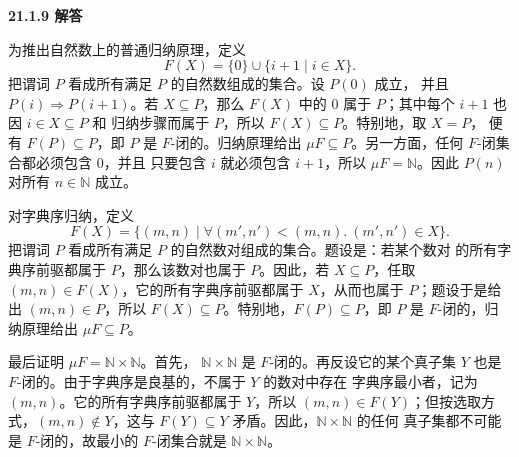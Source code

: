 \begin{taplauthorsolutionentrybox}
\label{sol:author:21.1.9}
\textbf{21.1.9 解答}

为推出自然数上的普通归纳原理，定义
\[
F(X)=\{0\}\cup\{i+1\mid i\in X\}.
\]
把谓词 \(P\) 看成所有满足 \(P\) 的自然数组成的集合。设 \(P(0)\) 成立，
并且 \(P(i)\Rightarrow P(i+1)\)。若 \(X\subseteq P\)，那么 \(F(X)\)
中的 \(0\) 属于 \(P\)；其中每个 \(i+1\) 也因 \(i\in X\subseteq P\) 和
归纳步骤而属于 \(P\)，所以 \(F(X)\subseteq P\)。特别地，取 \(X=P\)，
便有 \(F(P)\subseteq P\)，即 \(P\) 是 \(F\)-闭的。归纳原理给出
\(\mu F\subseteq P\)。另一方面，任何 \(F\)-闭集合都必须包含 \(0\)，并且
只要包含 \(i\) 就必须包含 \(i+1\)，所以 \(\mu F=\mathbb N\)。因此
\(P(n)\) 对所有 \(n\in\mathbb N\) 成立。

对字典序归纳，定义
\[
F(X)=\{(m,n)\mid
  \forall(m',n')<(m,n).\ (m',n')\in X\}.
\]
把谓词 \(P\) 看成所有满足 \(P\) 的自然数对组成的集合。题设是：若某个数对
的所有字典序前驱都属于 \(P\)，那么该数对也属于 \(P\)。因此，若
\(X\subseteq P\)，任取 \((m,n)\in F(X)\)，它的所有字典序前驱都属于
\(X\)，从而也属于 \(P\)；题设于是给出 \((m,n)\in P\)，所以
\(F(X)\subseteq P\)。特别地，\(F(P)\subseteq P\)，即 \(P\) 是
\(F\)-闭的，归纳原理给出 \(\mu F\subseteq P\)。

最后证明 \(\mu F=\mathbb N\times\mathbb N\)。首先，
\(\mathbb N\times\mathbb N\) 是 \(F\)-闭的。再反设它的某个真子集
\(Y\) 也是 \(F\)-闭的。由于字典序是良基的，不属于 \(Y\) 的数对中存在
字典序最小者，记为 \((m,n)\)。它的所有字典序前驱都属于 \(Y\)，所以
\((m,n)\in F(Y)\)；但按选取方式，\((m,n)\notin Y\)，这与
\(F(Y)\subseteq Y\) 矛盾。因此，\(\mathbb N\times\mathbb N\) 的任何
真子集都不可能是 \(F\)-闭的，故最小的 \(F\)-闭集合就是
\(\mathbb N\times\mathbb N\)。


\end{taplauthorsolutionentrybox}

